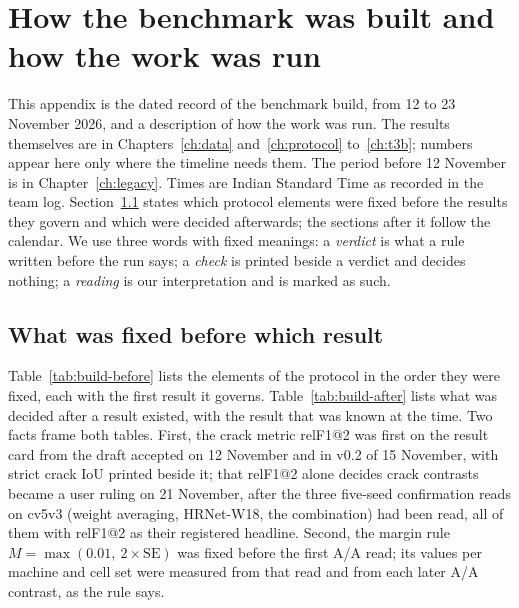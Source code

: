 \chapter{How the benchmark was built and how the work was run}\label{app:build}

This appendix is the dated record of the benchmark build, from 12 to 23 November 2026, and a description of how the work was run.
The results themselves are in Chapters~\ref{ch:data} and~\ref{ch:protocol} to~\ref{ch:t3b}; numbers appear here only where the
timeline needs them. The period before 12 November is in Chapter~\ref{ch:legacy}. Times are Indian Standard Time as recorded in the
team log. Section~\ref{sec:build-order} states which protocol elements were fixed before the results they govern and which were
decided afterwards; the sections after it follow the calendar. We use three words with fixed meanings: a \emph{verdict} is what a
rule written before the run says; a \emph{check} is printed beside a verdict and decides nothing; a \emph{reading} is our
interpretation and is marked as such.

\section{What was fixed before which result}\label{sec:build-order}

Table~\ref{tab:build-before} lists the elements of the protocol in the order they were fixed, each with the first result it governs.
Table~\ref{tab:build-after} lists what was decided after a result existed, with the result that was known at the time. Two
facts frame both tables. First, the crack metric relF1@2 was first on the result card from the draft accepted on 12 November and in
v0.2 of 15 November, with strict crack IoU printed beside it; that relF1@2 alone decides crack contrasts became a user ruling on 21
November, after the three five-seed confirmation reads on cv5v3 (weight averaging, HRNet-W18, the combination) had been read, all
of them with relF1@2 as their registered headline.
Second, the margin rule $M=\max(0.01,\ 2\times\mathrm{SE})$ was fixed before the first A/A read; its values per machine and cell
set were measured from that read and from each later A/A contrast, as the rule says.


